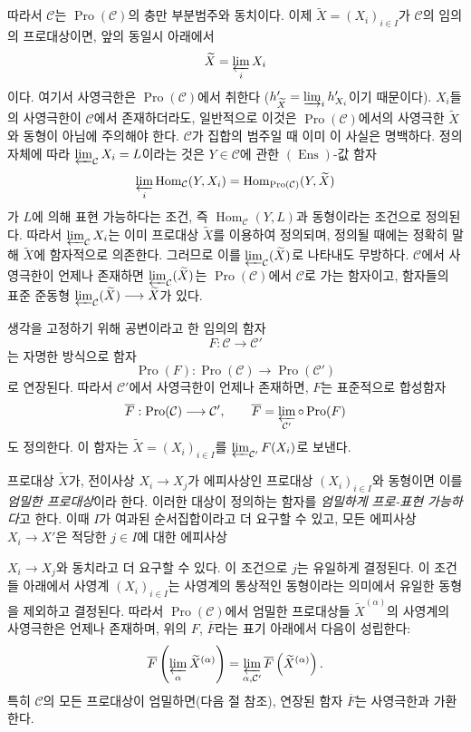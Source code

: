 \documentclass[11pt,twoside,openany]{book}
\numberwithin{equation}{section}
\newcommand{\sourceunit}{front}
\newcommand{\src}[1]{%
  \phantomsection\hypertarget{src:\sourceunit:#1}{}%
  \marginpar{\raggedleft\footnotesize\sffamily #1}%
}
\theoremstyle{plain}
\theoremstyle{definition}
\theoremstyle{remark}
\begin{document}
\src{372}
따라서 $\mathcal C$는 $\operatorname{Pro}(\mathcal C)$의 충만 부분범주와
동치이다. 이제 $\widetilde X=(X_i)_{i\in I}$가 $\mathcal C$의 임의의
프로대상이면, 앞의 동일시 아래에서
\[
  \widetilde X=\varprojlim_i X_i
\]
이다. 여기서 사영극한은 $\operatorname{Pro}(\mathcal C)$에서 취한다
($h'_{\widetilde X}=\varinjlim_i h'_{X_i}$이기 때문이다). $X_i$들의
사영극한이 $\mathcal C$에서 존재하더라도, 일반적으로 이것은
$\operatorname{Pro}(\mathcal C)$에서의 사영극한 $\widetilde X$와 동형이
아님에 주의해야 한다. $\mathcal C$가 집합의 범주일 때 이미 이 사실은
명백하다. 정의 자체에 따라 $\varprojlim_{\mathcal C}X_i=L$이라는 것은
$Y\in\mathcal C$에 관한 $(\operatorname{Ens})$-값 함자
\[
  \varprojlim_i\operatorname{Hom}_{\mathcal C}(Y,X_i)
  =\operatorname{Hom}_{\operatorname{Pro}(\mathcal C)}(Y,\widetilde X)
\]
가 $L$에 의해 표현 가능하다는 조건, 즉
$\operatorname{Hom}_{\mathcal C}(Y,L)$과 동형이라는 조건으로 정의된다.
따라서 $\varprojlim_{\mathcal C}X_i$는 이미 프로대상 $\widetilde X$를
이용하여 정의되며, 정의될 때에는 정확히 말해 $\widetilde X$에
함자적으로 의존한다. 그러므로 이를
$\varprojlim_{\mathcal C}(\widetilde X)$로 나타내도 무방하다.
$\mathcal C$에서 사영극한이 언제나 존재하면
$\varprojlim_{\mathcal C}(\widetilde X)$는
$\operatorname{Pro}(\mathcal C)$에서 $\mathcal C$로 가는 함자이고,
함자들의 표준 준동형
$\varprojlim_{\mathcal C}(\widetilde X)\longrightarrow\widetilde X$가 있다.

생각을 고정하기 위해 공변이라고 한 임의의 함자
\[
  F:\mathcal C\longrightarrow\mathcal C'
\]
는 자명한 방식으로 함자
\[
  \operatorname{Pro}(F):\operatorname{Pro}(\mathcal C)
  \longrightarrow\operatorname{Pro}(\mathcal C')
\]
로 연장된다. 따라서 $\mathcal C'$에서 사영극한이 언제나 존재하면,
$F$는 표준적으로 합성함자
\[
  \overline F:\operatorname{Pro}(\mathcal C)\longrightarrow\mathcal C',
  \qquad
  \overline F=\varprojlim_{\mathcal C'}\circ\operatorname{Pro}(F)
\]
도 정의한다. 이 함자는 $\widetilde X=(X_i)_{i\in I}$를
$\varprojlim_{\mathcal C'}F(X_i)$로 보낸다.

프로대상 $\widetilde X$가, 전이사상 $X_i\longrightarrow X_j$가
에피사상인 프로대상 $(X_i)_{i\in I}$와 동형이면 이를
\emph{엄밀한 프로대상}이라 한다. 이러한 대상이 정의하는 함자를
\emph{엄밀하게 프로-표현 가능하다}고 한다. 이때 $I$가 여과된
순서집합이라고 더 요구할 수 있고, 모든 에피사상
$X_i\longrightarrow X'$은 적당한 $j\in I$에 대한 에피사상

\src{373}
$X_i\longrightarrow X_j$와 동치라고 더 요구할 수 있다. 이 조건으로
$j$는 유일하게 결정된다. 이 조건들 아래에서 사영계
$(X_i)_{i\in I}$는 사영계의 통상적인 동형이라는 의미에서 유일한 동형을
제외하고 결정된다. 따라서 $\operatorname{Pro}(\mathcal C)$에서 엄밀한
프로대상들 $\widetilde X^{(\alpha)}$의 사영계의 사영극한은 언제나
존재하며, 위의 $F$, $\overline F$라는 표기 아래에서 다음이 성립한다:
\[
  \overline F\left(\varprojlim_\alpha\widetilde X^{(\alpha)}\right)
  =\varprojlim_{\alpha,\mathcal C'}
  \overline F\left(\widetilde X^{(\alpha)}\right).
\]
특히 $\mathcal C$의 모든 프로대상이 엄밀하면(다음 절 참조), 연장된 함자
$\overline F$는 사영극한과 가환한다.
\end{document}
